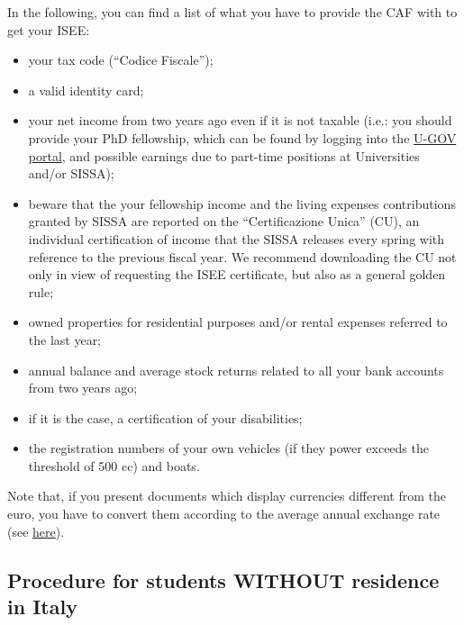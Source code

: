 \documentclass{sissavademecum}
\begin{document}
In the following, you can find a list of what you have to provide the CAF with to get your ISEE:
\begin{itemize}
    \item your tax code (``Codice Fiscale'');
    \item a valid identity card;
    \item your net income from two years ago even if it is not taxable (i.e.: you should provide your PhD fellowship, which can be found by logging into the \href{https://www.sissa.u-gov.it/u-gov-ru/bp/desktop.RU99CEDOLID_1914958969.RU99CEDOL/siaru/cedolini/cedolini_main.iface}{U-GOV portal}, and possible earnings due to part-time positions at Universities and/or SISSA);
    \item beware that the your fellowship income and the living expenses contributions granted by SISSA are reported on the ``Certificazione Unica'' (CU), an individual certification of income that the SISSA releases every spring with reference to the previous fiscal year. We recommend downloading the CU not only in view of requesting the ISEE certificate, but also as a general golden rule;
    \item owned properties for residential purposes and/or rental expenses referred to the last year;
    \item annual balance and average stock returns related to all your bank accounts from two years ago;
    \item if it is the case, a certification of your disabilities;
    \item the registration numbers of your own vehicles (if they power exceeds the threshold of 500 cc) and boats.
\end{itemize}
Note that, if you present documents which display currencies different from the euro, you have to convert them according to the average annual exchange rate (see \href{https://tassidicambio.bancaditalia.it/terzevalute-wf-ui-web/averageRates}{here}).


\subsection{Procedure for students WITHOUT residence in Italy}
\end{document}
